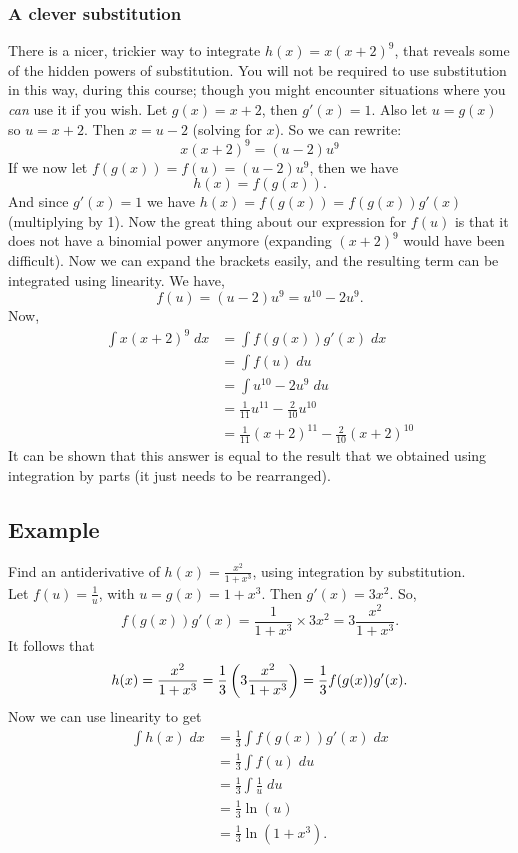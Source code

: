 \subsubsection{A clever substitution}
There is a nicer, trickier way to integrate $h(x) = x(x+2)^9$, that reveals some of the hidden powers of substitution. You will not be required to use substitution in this way, during this course; though you might encounter situations where you \textit{can} use it if you wish. Let  $g(x) = x+2$, then $g'(x) = 1$. Also let $u = g(x)$ so $u = x+2$. Then $x = u - 2$ (solving for $x$). So we can rewrite:
\[
x(x+2)^9 = (u-2)u^9 \tag{where $u = x+2$}
\]
If we now let $f(g(x)) = f(u) = (u-2)u^9$, then we have
\[
h(x) = f(g(x)). \tag{where $g(x) = x+2$}
\]
And since $g'(x) = 1$ we have $h(x) = f(g(x)) = f(g(x))g'(x)$ (multiplying by 1).
Now the great thing about our expression for $f(u)$ is that it does not have a binomial power anymore (expanding $(x+2)^9$ would have been difficult). Now we can expand the brackets easily, and the resulting term can be integrated using linearity. We have,
\[
f(u) = (u-2)u^9 = u^{10} - 2u^9. \tag{expanding the brackets}
\]
Now,
\begin{align*}
\int x(x+2)^9 \; dx & = \int f(g(x))g'(x) \; dx \\
	& = \int f(u) \; du  \tag{integration by substitution} \\
	& = \int u^{10} - 2u^9 \; du \\
	& = \frac{1}{11}u^{11} - \frac{2}{10}u^{10} \tag{linearity} \\
	& = \frac{1}{11}(x+2)^{11} - \frac{2}{10}(x+2)^{10}
\end{align*}
It can be shown that this answer is equal to the result that we obtained using integration by parts (it just needs to be rearranged).

\subsection{Example}
Find an antiderivative of $\displaystyle{h(x) = \frac{x^2}{1+x^3}}$, using integration by substitution. \\

\solution
Let $f(u) = \frac{1}{u}$, with $u = g(x) = 1 + x^3$. Then $g'(x) = 3x^2$. So,
\[
f(g(x))g'(x) = \frac{1}{1+x^3}\times3x^2 = 3 \frac{x^2}{1+x^3}.
\]
It follows that
\[
h(x) = \frac{x^2}{1+x^3} = \frac{1}{3}\left(3 \frac{x^2}{1+x^3}\right) = \frac{1}{3}f(g(x))g'(x). 
\]
Now we can use linearity to get
\begin{align*}
\int h(x) \; dx & = \frac{1}{3}\int f(g(x))g'(x) \; dx \\
		& = \frac{1}{3}\int f(u) \; du \tag{integration by substitution} \\
		& = \frac{1}{3}\int \frac{1}{u} \; du \\
		& = \frac{1}{3}\ln(u) \tag{integration formula} \\
		& = \frac{1}{3}\ln(1 + x^3). \tag{as $u = 1+ x^3$}
\end{align*}

